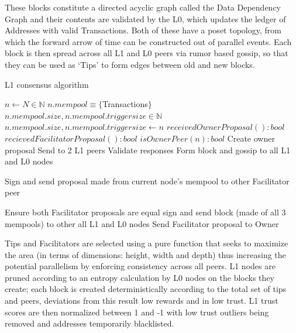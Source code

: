 \documentclass{article}
\begin{document}
These blocks constitute a directed acyclic graph called the Data Dependency Graph and their contents are validated by the L0, which updates the ledger of Addresses with valid Transactions. Both of these have a poset topology, from which the forward arrow of time can be constructed out of parallel events. Each block is then spread across all L1 and L0 peers via rumor based gossip, so that they can be used as ‘Tips’ to form edges between old and new blocks.

\begin{algorithm}
\caption{L1 consensus algorithm}\label{alg:cap}
\begin{algorithmic}

\State $n \gets N \in \mathbb{N}$ 
\State $n.mempool \equiv \{ $Transactions$ \}$
\State $n.mempool.size, n.mempool.triggersize \in \mathbb{N}$
\State $n.mempool.size, n.mempool.triggersize \gets n$ 
\State $received Owner Proposal(): bool$
\State $recieved Facilitator Proposal(): bool$
\State $isOwnerPeer(n): bool$
		 \State Create owner proposal
		 \State Send to 2 L1 peers
		 \State Validate responses
		 \State Form block and gossip to all L1 and L0 nodes
		
			\State Sign and send proposal made from current node's mempool to other Facilitator peer
		
			\State Ensure both Facilitator proposals are equal
			\State sign and send block (made of all 3 mempools) to other all L1 and L0 nodes
		\Else
			\State Send Facilitator proposal to Owner
		\EndIf
	\EndIf
\EndWhile

\end{algorithmic}
\end{algorithm}

Tips and Facilitators are selected using a pure function that seeks to maximize the area (in terms of dimensions: height, width and depth) thus increasing the potential parallelism by enforcing consistency across all peers. L1 nodes are pruned according to an entropy calculation by L0 nodes on the blocks they create; each block is created deterministically according to the total set of tips and peers, deviations from this result low rewards and in low trust. L1 trust scores are then normalized between 1 and -1 with low trust outliers being removed and addresses temporarily blacklisted.
\end{document}
